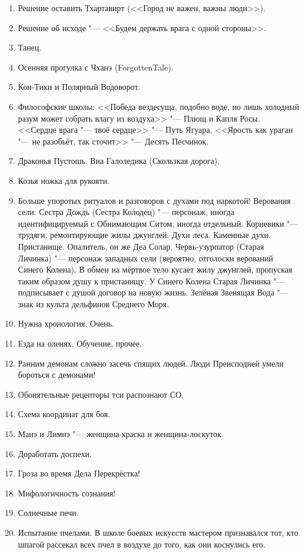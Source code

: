 \documentclass[a4paper,10pt]{book}
\begin{document}
\begin{enumerate}
\item Решение оставить Тхартавирт (<<Город не важен, важны люди>>).
\item Решение об исходе "--- <<Будем держать врага с одной стороны>>.
\item Танец.
\item Осенняя прогулка с Чханэ (ForgottenTale).
\item Кон-Тики и Полярный Водоворот.
\item Философские школы: <<Победа вездесуща, подобно воде, но лишь холодный 
разум может собрать влагу из воздуха>> "--- Плющ и Капля Росы. <<Сердце врага 
"--- твоё сердце>> "--- Путь Ягуара. <<Ярость как ураган "--- не разобьёт, так сточит>> "--- Десять Песчинок.
\item Драконья Пустошь. Виа Галоледика (Скользкая дорога).
\item Козья ножка для рукояти.
\item Больше упоротых ритуалов и разговоров с духами под наркотой! Верования 
сели:
Сестра Дождь (Сестра Колодец) "--- персонаж, иногда идентифицируемый с 
Обнимающим Ситом, иногда отдельный.
Корневики "--- трудяги, ремонтирующие жилы джунглей.
Духи леса.
Каменные духи.
Пристанище.
Опалитель, он же Деа Солар.
Червь-узурпатор (Старая Личинка) "--- персонаж западных сели (вероятно, 
отголоски верований Синего Колена). В обмен на мёртвое тело кусает жилу 
джунглей, пропуская таким образом душу к пристанищу. У Синего Колена Старая 
Личинка "--- подписывает с душой договор на новую жизнь.
Зелёная Звенящая Вода "--- знак из культа дельфинов Среднего Моря.
\item Нужна хронология. Очень.
\item Езда на оленях. Обучение, прочее.
\item Ранним демонам сложно засечь спящих людей. Люди Преисподней умели 
бороться с демонами!
\item Обонятельные рецепторы тси распознают СО.
\item Схема координат для боя.
\item Манэ и Лимнэ "--- женщина-краска и женщина-лоскуток.
\item Доработать доспехи.
\item Гроза во время Дела Перекрёстка!
\item Мифологичность сознания!
\item Солнечные печи.
\item Испытание пчелами. В школе боевых искусств мастером признавался тот, кто 
шпагой рассекал всех пчел в воздухе до того, как они коснулись его.

\end{enumerate}
\end{document}
